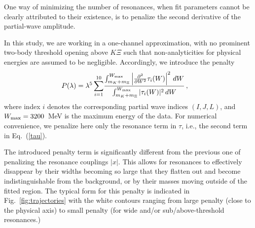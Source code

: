 \documentclass[10pt,aps,prc,superscriptaddress,twoside,twocolumn,nofootinbib,showpacs,preprintnumbers]{revtex4-1}
\begin{document}
One way of minimizing the number of resonances, when fit parameters cannot be clearly attributed to their existence, is to penalize the second derivative of the partial-wave amplitude. 

In this study, we are working in a one-channel approximation, with no prominent two-body threshold opening above $K\Xi$  such that non-analyticities for physical energies are assumed to be negligible. Accordingly,  we introduce the penalty
\begin{align}
\label{eq:penaly2}
P(\lambda)= \lambda^5\sum_{i=1}^{10} &\frac{\int_{m_K+m_{\Xi}}^{W_{\rm max}}\left|\frac{\partial^2}{\partial W^2} \tau_i(W)\right|^2\, dW}{\int_{m_K+m_{\Xi}}^{W_{\rm max}} |\tau_i(W)|^2\, dW }\,,
\end{align}
where index $i$ denotes the corresponding partial wave indices $(I,J,L)$, and $W_{\rm max}=3200$~MeV is the maximum energy of the data. For numerical convenience, we penalize here only the resonance term in $\tau$, i.e., the second term in Eq.~(\ref{tau}).

The introduced penalty term is significantly different from the previous one of penalizing the resonance couplings $|x|$. This allows for resonances to effectively disappear by their widths becoming so large that they flatten out and become indistinguishable from the background, or by their masses moving outside of the fitted region. The typical form for this penalty is indicated in Fig.~\ref{fig:trajectories} with the white contours ranging from large penalty (close to the physical axis) to small penalty (for wide and/or sub/above-threshold resonances.)
\end{document}
